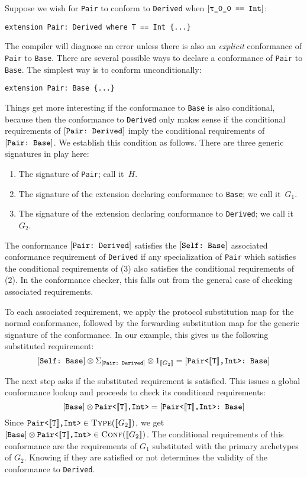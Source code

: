 \documentclass[../generics]{subfiles}
\begin{document}
Suppose we wish for \texttt{Pair} to conform to \texttt{Derived} when $\SameReq{\ttgp{0}{0}}{Int}$:
\begin{Verbatim}
extension Pair: Derived where T == Int {...}
\end{Verbatim}
The compiler will diagnose an error unless there is also an \emph{explicit} conformance of \texttt{Pair} to \texttt{Base}. There are several possible ways to declare a conformance of \texttt{Pair} to \texttt{Base}. The simplest way is to conform unconditionally:
\begin{Verbatim}
extension Pair: Base {...}
\end{Verbatim}
Things get more interesting if the conformance to \texttt{Base} is also conditional, because then the conformance to \texttt{Derived} only makes sense if the conditional requirements of $[\texttt{Pair:~Derived}]$ imply the conditional requirements of $[\texttt{Pair:~Base}]$. We establish this condition as follows. There are three generic signatures in play here:
\begin{enumerate}
\item The signature of \texttt{Pair}; call it~$H$.
\item The signature of the extension declaring conformance to \texttt{Base}; we call it~$G_1$.
\item The signature of the extension declaring conformance to \texttt{Derived}; we call it~$G_2$.
\end{enumerate}
The conformance $[\texttt{Pair:~Derived}]$ satisfies the $[\texttt{Self:~Base}]$ associated conformance requirement of \texttt{Derived} if any specialization of \verb|Pair| which satisfies the conditional requirements of (3) also satisfies the conditional requirements of (2). In the conformance checker, this falls out from the general case of checking associated requirements.

To each associated requirement, we apply the protocol substitution map for the normal conformance, followed by the forwarding substitution map for the generic signature of the conformance. In our example, this gives us the following substituted requirement:
\[
[\texttt{Self:~Base}]\otimes\Sigma_{[\texttt{Pair:~Derived}]}\otimes 1_{[\![G_2]\!]} = [\texttt{Pair<$[\![\texttt{T}]\!]$,Int>:~Base}]
\]

The next step asks  if the substituted requirement is satisfied. This issues a global conformance lookup and proceeds to check its conditional requirements:
\[[\texttt{Base}]\otimes \texttt{Pair<$[\![\texttt{T}]\!]$,Int>} = [\texttt{\texttt{Pair<$[\![\texttt{T}]\!]$,Int>}:~Base}] \]
Since $\texttt{Pair<$[\![\texttt{T}]\!]$,Int>}\in\textsc{Type}({[\![G_2]\!]})$, we get $[\texttt{Base}]\otimes \texttt{Pair<$[\![\texttt{T}]\!]$,Int>}\in\textsc{Conf}({[\![G_2]\!]})$. The conditional requirements of this conformance are the requirements of $G_1$ substituted with the primary archetypes of $G_2$. Knowing if they are satisfied or not determines the validity of the conformance to \texttt{Derived}.
\end{document}

